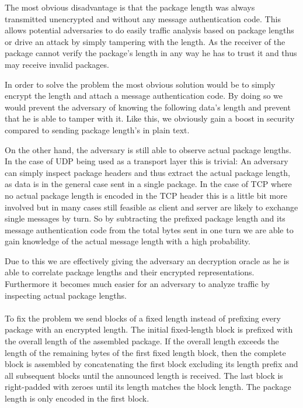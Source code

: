 The most obvious disadvantage is that the package length was always transmitted unencrypted and without any message authentication code.
This allows potential adversaries to do easily traffic analysis based on package lengths or drive an attack by simply tampering with the length.
As the receiver of the package cannot verify the package's length in any way he has to trust it and thus may receive invalid packages.

In order to solve the problem the most obvious solution would be to simply encrypt the length and attach a message authentication code.
By doing so we would prevent the adversary of knowing the following data's length and prevent that he is able to tamper with it.
Like this, we obviously gain a boost in security compared to sending package length's in plain text.

On the other hand, the adversary is still able to observe actual package lengths.
In the case of UDP being used as a transport layer this is trivial:
An adversary can simply inspect package headers and thus extract the actual package length, as data is in the general case sent in a single package.
In the case of TCP where no actual package length is encoded in the TCP header this is a little bit more involved but in many cases still feasible as client and server are likely to exchange single messages by turn.
So by subtracting the prefixed package length and its message authentication code from the total bytes sent in one turn we are able to gain knowledge of the actual message length with a high probability.

Due to this we are effectively giving the adversary an decryption oracle as he is able to correlate package lengths and their encrypted representations.
Furthermore it becomes much easier for an adversary to analyze traffic by inspecting actual package lengths.
\\\\

To fix the problem we send blocks of a fixed length instead of prefixing every package with an encrypted length.
The initial fixed-length block is prefixed with the overall length of the assembled package.
If the overall length exceeds the length of the remaining bytes of the first fixed length block, then the complete block is assembled by concatenating the first block excluding its length prefix and all subsequent blocks until the announced length is received.
The last block is right-padded with zeroes until its length matches the block length.
The package length is only encoded in the first block.

